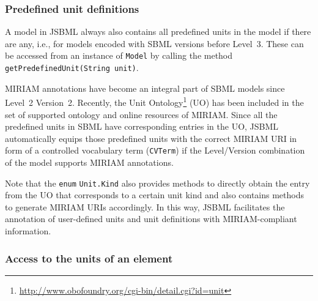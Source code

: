 \subsubsection{Predefined unit definitions}

A model in JSBML
%
always also contains all predefined units in the model
if there are any, i.e., for models encoded with SBML versions before Level~3.
%
These can be accessed from an instance of \texttt{Model} by calling the method
\texttt{getPredefinedUnit(String unit)}.

MIRIAM annotations \citep{Novere2005} have become an integral part of SBML models
since Level~2 Version~2. Recently, the Unit
Ontology\footnote{\url{http://www.obofoundry.org/cgi-bin/detail.cgi?id=unit}}
%
(UO) has been included in the set of supported ontology and online resources of
MIRIAM. Since all the predefined units in SBML have corresponding entries in the
UO, JSBML
%
automatically equips those predefined units with the correct MIRIAM
URI in form of a controlled vocabulary term (\texttt{CVTerm}) if the
Level/Version combination of the model supports MIRIAM annotations.

Note that the \texttt{enum} \texttt{Unit.Kind}
%
also provides methods to directly obtain the entry from the UO that corresponds
to a certain unit kind and also contains methods to generate MIRIAM URIs
accordingly. In this way, JSBML facilitates the annotation of user-defined
units and unit definitions with MIRIAM-compliant
information.

\subsubsection{Access to the units of an element}

